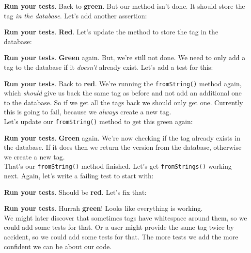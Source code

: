 \textbf{Run your tests}. Back to \textbf{green}. But our method isn't done. It should store the tag \textit{in the database}. Let's add another assertion:


\textbf{Run your tests}. \textbf{Red}. Let's update the method to store the tag in the database:


\textbf{Run your tests}. \textbf{Green} again. But, we're still not done. We need to only add a tag to the database if it \textit{doesn't} already exist. Let's add a test for this:


\textbf{Run your tests}. Back to \textbf{red}. We're running the \texttt{fromString()} method again, which \textit{should} give us back the same tag as before and not add an additional one to the database. So if we get all the tags back we should only get one. Currently this is going to fail, because we \textit{always} create a new tag.
\\

Let's update our \texttt{fromString()} method to get this green again:



\textbf{Run your tests}. \textbf{Green} again. We're now checking if the tag already exists in the database. If it does then we return the version from the database, otherwise we create a new tag.
\\

That's our \texttt{fromString()} method finished. Let's get \texttt{fromStrings()} working next. Again, let's write a failing test to start with:



\textbf{Run your tests}. Should be \textbf{red}. Let's fix that:



\textbf{Run your tests}. Hurrah \textbf{green}! Looks like everything is working.
\\

We might later discover that sometimes tags have whitespace around them, so we could add some tests for that. Or a user might provide the same tag twice by accident, so we could add some tests for that. The more tests we add the more confident we can be about our code.
\\


